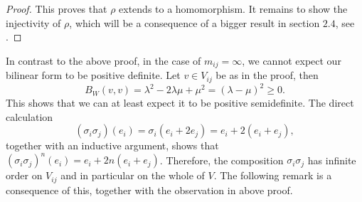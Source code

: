 \begin{proof}

    \noindent
    This proves that \(\rho\) extends to a homomorphism.
    It remains to show the injectivity of \(\rho\), which will be a consequence of a bigger result in section \(2.4\), see .
\end{proof}

In contrast to the above proof, in the case of \(m_{ij} = \infty\), we cannot expect our bilinear form to be positive definite.
Let \(v \in V_{ij}\) be as in the proof, then
\[B_W(v,v) = \lambda^2 - 2\lambda\mu + \mu^2 = (\lambda - \mu)^2 \geq 0.\]
This shows that we can at least expect it to be positive semidefinite.
The direct calculation
\[(\sigma_i\sigma_j)(e_i) = \sigma_i(e_i + 2e_j) = e_i + 2(e_i + e_j),\]
together with an inductive argument, shows that \((\sigma_i\sigma_j)^n(e_i) = e_i + 2n(e_i + e_j)\).
Therefore, the composition \(\sigma_i\sigma_j\) has infinite order on \(V_{ij}\) and in particular on the whole of \(V\).
The following remark is a consequence of this, together with the observation in above proof.

